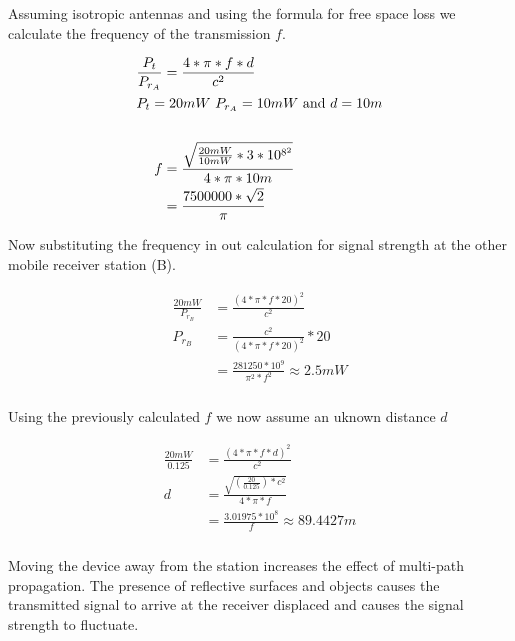 \documentclass[12pt]{article}
\newcommand{\multipartexercise}{\addtocounter{subsection}{1}\setcounter{subsubsection}{0}}
\newcommand{\exercisepart}{\subsubsection{}}
\begin{document}
\multipartexercise \exercisepart
Assuming isotropic antennas and using the formula for free space loss we calculate the frequency of the transmission $f$.

\begin{align*}
    \frac{P_t}{P_{r_A}} &= \frac{4*\pi*f*d}{c^2} \\
    \intertext{$P_t=20mW$ $P_{r_A}=10mW$ and $d=10m$} \\
    f &= \frac{\sqrt{\frac{20mW}{10mW}*3*10^{8^2}}}{4*\pi*10m} \\
    &= \frac{7500000*\sqrt{2}}{\pi}
\end{align*}

Now substituting the frequency in out calculation for signal strength at the other mobile receiver station (B).

\begin{align*}
    \frac{20mW}{P_{r_B}} &= \frac{(4*\pi*f*20)^2}{c^2} \\
    P_{r_B} &= \frac{c^2}{(4*\pi*f*20)^2}*20 \\
    &= \frac{281250*10^9}{\pi^2*f^2} \approx 2.5mW
\end{align*}

\exercisepart
Using the previously calculated $f$ we now assume an uknown distance $d$

\begin{align*}
    \frac{20mW}{0.125} &= \frac{(4*\pi*f*d)^2}{c^2} \\
    d &= \frac{\sqrt{(\frac{20}{0.125})*c^2}}{4*\pi*f} \\
    &= \frac{3.01975*10^8}{f} \approx 89.4427m
\end{align*}

\exercisepart
Moving the device away from the station increases the effect of multi-path propagation. The presence of reflective surfaces and objects causes the transmitted signal to arrive at the receiver displaced and causes the signal strength to fluctuate.
\end{document}
